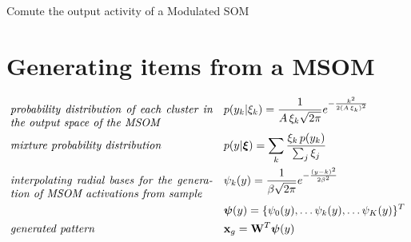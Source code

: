 \documentclass[a4paper]{article}
\begin{document}
\IncMargin{1em}
\begin{algorithm}[H]
\DontPrintSemicolon
{}


\BlankLine

\BlankLine


\caption{Comute the output activity of a Modulated SOM}
\label{msomspread}

\end{algorithm}
\DecMargin{1em}

\pagebreak

\section*{Generating items from a MSOM}

\begin{align}
	& \emph{\parbox[t]{2.5in}{probability distribution of 
    each cluster in the output space of the MSOM}} && 
    p(y_k|\xi_k) = \frac{1}{A\,\xi_k\sqrt{2\pi}} 
    e^{-\frac{k^2}{2(A\,\xi_k)^2}}\nonumber\\
    & \emph{mixture probability distribution} && 
    p(y|\boldsymbol{\xi}) = \sum_k \frac{\xi_k\, p(y_k)}
    {\sum_j\xi_j}\nonumber\\
    & \emph{\parbox[t]{2.5in}{interpolating radial bases
    for the generation of MSOM activations from sample}} && 
    \psi_k(y) = \frac{1}{\beta\sqrt{2\pi}}
    e^{-\frac{(y-k)^2}{2\beta^2}}\nonumber\\
    & &&\boldsymbol{\psi}(y) = \{\psi_0(y),\dots\psi_k(y), 
    \dots\psi_K(y)\}^T \nonumber\\
    & \emph{generated pattern} &&
    \mathbf{x}_g = \mathbf{W}^T\boldsymbol{\psi}(y)\nonumber     
\end{align}
\end{document}
